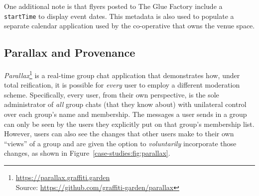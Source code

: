 One additional note is that flyers posted to The Glue Factory include a \texttt{startTime}
to display event dates.
This metadata is also used to populate a separate calendar application
used by the co-operative that owns the venue space.

\subsection{Parallax and Provenance}
\label{case-studies:parallax}


\emph{Parallax}\footnote{
\url{https://parallax.graffiti.garden}\\Source: \url{https://github.com/graffiti-garden/parallax}
} is a real-time group chat application that demonstrates
how, under total reification, it is possible for \emph{every} user to employ a different
moderation scheme.
Specifically,
every user, from their own perspective,
is the sole administrator of \emph{all} group chats (that they know about) with
unilateral control over each group's name and membership.
The messages a user sends in a group can only be seen by the users they explicitly
put on that group's membership list.
However, users can also see the changes that other users
make to their own ``views'' of a group and are given the option
to \emph{voluntarily} incorporate those changes,
as shown in Figure~\ref{case-studies:fig:parallax}.

